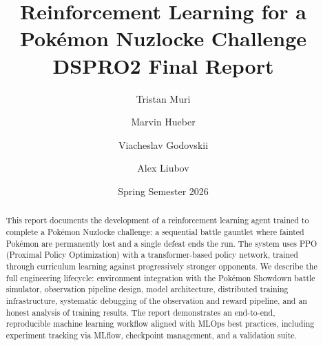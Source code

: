 \documentclass[11pt,a4paper]{report}
\title{Reinforcement Learning for a Pok\'{e}mon Nuzlocke Challenge\\[0.3em]
\large DSPRO2 Final Report}
\author{Tristan Muri \and Marvin Hueber \and Viacheslav Godovskii \and Alex Liubov}
\date{Spring Semester 2026}
\begin{document}
\maketitle

\begin{abstract}
This report documents the development of a reinforcement learning agent trained to complete a
Pok\'{e}mon Nuzlocke challenge: a sequential battle gauntlet where fainted Pok\'{e}mon are
permanently lost and a single defeat ends the run.  The system uses PPO (Proximal Policy
Optimization) with a transformer-based policy network, trained through curriculum learning against
progressively stronger opponents.  We describe the full engineering lifecycle: environment
integration with the Pok\'{e}mon Showdown battle simulator, observation pipeline design,
model architecture, distributed training infrastructure, systematic debugging of the observation
and reward pipeline, and an honest analysis of training results.  The report demonstrates an
end-to-end, reproducible machine learning workflow aligned with MLOps best practices, including
experiment tracking via MLflow, checkpoint management, and a validation suite.
\end{abstract}

\tableofcontents
\newpage








\appendix


\end{document}
